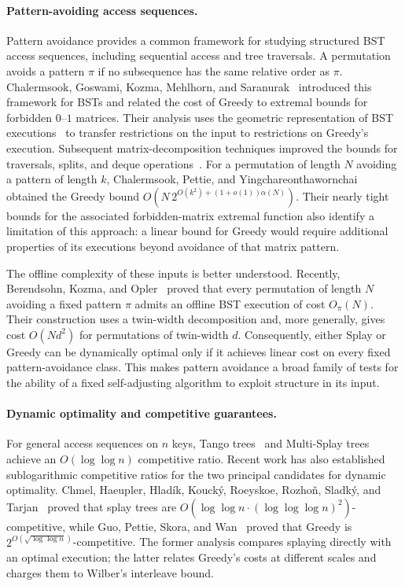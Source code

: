 \documentclass[11pt]{article}
\theoremstyle{definition}
\theoremstyle{remark}
\begin{document}
\paragraph{Pattern-avoiding access sequences.}
Pattern avoidance provides a common framework for studying
structured BST access sequences, including sequential access
and tree traversals. A permutation avoids a pattern $\pi$ if
no subsequence has the same relative order as $\pi$.
Chalermsook, Goswami, Kozma, Mehlhorn, and
Saranurak~\cite{ChalermsookGoswamiKozmaMehlhornSaranurak2015FOCS} introduced this
framework for BSTs and related the cost of Greedy to
extremal bounds for forbidden $0$--$1$ matrices.
Their analysis uses the geometric representation of BST
executions~\cite{DemaineHarmonIaconoKanePatrascu2009} to transfer restrictions
on the input to restrictions on Greedy's execution.
Subsequent matrix-decomposition techniques improved the bounds
for traversals, splits, and deque
operations~\cite{Chalermsook2023}.
For a permutation of length $N$ avoiding a pattern of length $k$,
Chalermsook, Pettie, and
Yingchareonthawornchai~\cite{chalermsook2024sorting}
obtained the Greedy bound
$O(N\,2^{O(k^2)+(1+o(1))\alpha(N)})$.
Their nearly tight bounds for the associated forbidden-matrix
extremal function also identify a limitation of this approach:
a linear bound for Greedy would require additional properties
of its executions beyond avoidance of that matrix pattern.

The offline complexity of these inputs is better understood.
Recently, Berendsohn, Kozma, and
Opler~\cite{berendsohn2024optimization} proved that every
permutation of length $N$ avoiding a fixed pattern $\pi$
admits an offline BST execution of cost $O_\pi(N)$.
Their construction uses a twin-width decomposition and,
more generally, gives cost $O(Nd^2)$ for permutations of
twin-width $d$.
Consequently, either Splay or Greedy can be dynamically optimal
only if it achieves linear cost on every fixed
pattern-avoidance class. This makes pattern avoidance a broad family of tests for
the ability of a fixed self-adjusting algorithm to exploit
structure in its input.

\paragraph{Dynamic optimality and competitive guarantees.}
For general access sequences on $n$ keys,
Tango trees~\cite{DemaineHarmonIaconoPatrascu2007} and
Multi-Splay trees~\cite{WangDerryberrySleator2006} achieve an
$O(\log\log n)$ competitive ratio.
Recent work has also established sublogarithmic competitive
ratios for the two principal candidates for dynamic optimality.
Chmel, Haeupler, Hlad{\'i}k, Kouck{\'y}, Roeyskoe, Rozho{\v{n}}, Sladk{\'y}, and Tarjan~\cite{Splay2026} proved that splay trees are
$O(\log\log n\cdot(\log\log\log n)^2)$-competitive,
while Guo, Pettie, Skora, and Wan~\cite{guo2026greedy}
proved that Greedy is
$2^{O(\sqrt{\log\log n})}$-competitive.
The former analysis compares splaying directly with an
optimal execution; the latter relates Greedy's costs at
different scales and charges them to Wilber's interleave bound.
\end{document}
